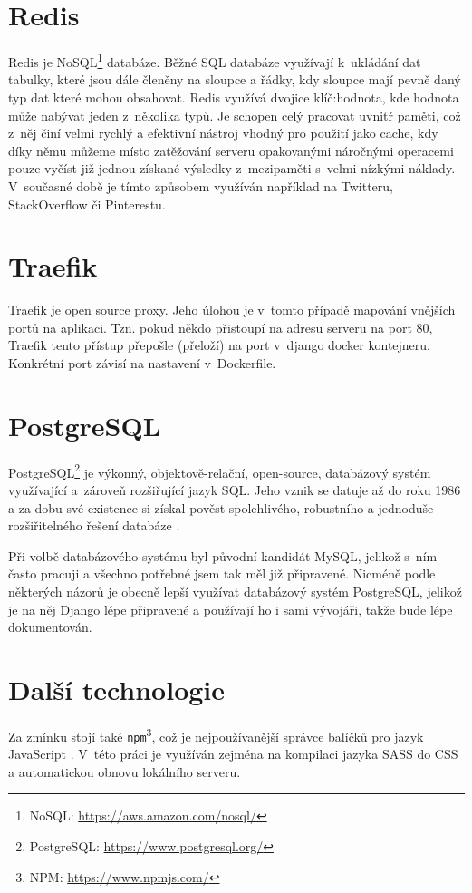 \section{Redis}
Redis je NoSQL\footnote{NoSQL: \url{https://aws.amazon.com/nosql/}} databáze. Běžné SQL databáze využívají k~ukládání dat tabulky, které jsou dále členěny na sloupce a řádky, kdy sloupce mají pevně daný typ dat které mohou obsahovat. Redis využívá dvojice klíč:hodnota, kde hodnota může nabývat jeden z~několika typů. Je schopen celý pracovat uvnitř paměti, což z~něj činí velmi rychlý a efektivní nástroj vhodný pro použití jako cache, kdy díky němu můžeme místo zatěžování serveru opakovanými náročnými operacemi pouze vyčíst již jednou získané výsledky z~mezipaměti s~velmi nízkými náklady. V~současné době je tímto způsobem využíván například na Twitteru, StackOverflow či Pinterestu.

\section{Traefik}
Traefik je open source proxy. Jeho úlohou je v~tomto případě mapování vnějších portů na aplikaci. Tzn. pokud někdo přistoupí na adresu serveru na port 80, Traefik tento přístup přepošle (přeloží) na port v~django docker kontejneru. Konkrétní port závisí na nastavení v~Dockerfile.


\section{PostgreSQL}
PostgreSQL\footnote{PostgreSQL: \url{https://www.postgresql.org/}} je výkonný, objektově-relační, open-source, databázový systém využívající a~zároveň rozšiřující jazyk SQL. Jeho vznik se datuje až do roku 1986 a za dobu své existence si získal pověst spolehlivého, robustního a jednoduše rozšiřitelného řešení databáze \cite{PostgreSQL}.
\par Při volbě databázového systému byl původní kandidát MySQL, jelikož s~ním často pracuji a všechno potřebné jsem tak měl již připravené. Nicméně podle některých názorů \cite{WHY-POSTGRES1}\cite{WHY-POSTGRES2} je obecně lepší využívat databázový systém PostgreSQL, jelikož je na něj Django lépe připravené a používají ho i sami vývojáři, takže bude lépe dokumentován.

\section{Další technologie}
Za zmínku stojí také \texttt{npm}\footnote{NPM: \url{https://www.npmjs.com/}}, což je nejpoužívanější správce balíčků pro jazyk JavaScript \cite{npm}. V~této práci je využíván zejména na kompilaci jazyka SASS do CSS a automatickou obnovu lokálního serveru.



